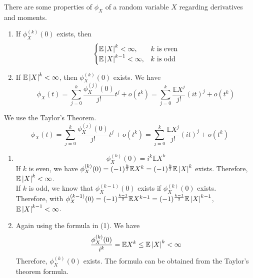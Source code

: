 \documentclass{huhtakm-template-book}
\newcommand{\expect}{\mathbb{E}}
\begin{document}
\begin{thm}
	There are some properties of $\phi_{X}$ of a random variable $X$ regarding derivatives and moments.
	\begin{enumerate}
		\item If $\phi_{X}^{(k)}(0)$ exists, then
		\begin{equation*}
			\begin{cases}
				\expect\abs{X}^{k}<\infty, &k\text{ is even}\\
				\expect\abs{X}^{k-1}<\infty, &k\text{ is odd}
			\end{cases}
		\end{equation*}
		\item If $\expect\abs{X}^{k}<\infty$, then $\phi_{X}^{(k)}(0)$ exists. We have
		\begin{equation*}
			\phi_{X}(t)=\sum_{j=0}^{k}\frac{\phi_{X}^{(j)}(0)}{j!}t^{j}+o(t^{k})=\sum_{j=0}^{k}\frac{\expect X^{j}}{j!}(it)^{j}+o(t^{k})
		\end{equation*}
	\end{enumerate}
\end{thm}
\begin{proofing}
	We use the Taylor's Theorem.
	\begin{equation*}
		\phi_{X}(t)=\sum_{j=0}^{k}\frac{\phi_{X}^{(j)}(0)}{j!}t^{j}+o(t^{k})=\sum_{j=0}^{k}\frac{\expect X^{j}}{j!}(it)^{j}+o(t^{k})
	\end{equation*}
	\begin{enumerate}
		\item 
		\begin{equation*}
			\phi_{X}^{(k)}(0)=i^{k}\expect X^{k}
		\end{equation*}
		If $k$ is even, we have $\phi_{X}^{(k)}(0)=(-1)^{\frac{k}{2}}\expect X^{k}=(-1)^{\frac{k}{2}}\expect\abs{X}^{k}$ exists. Therefore, $\expect\abs{X}^{k}<\infty$.\\
		If $k$ is odd, we know that $\phi_{X}^{(k-1)}(0)$ exists if $\phi_{X}^{(k)}(0)$ exists.\\
		Therefore, with $\phi_{X}^{(k-1)}(0)=(-1)^{\frac{k-1}{2}}\expect X^{k-1}=(-1)^{\frac{k-1}{2}}\expect\abs{X}^{k-1}$, $\expect\abs{X}^{k-1}<\infty$.
		\item Again using the formula in (1). We have
		\begin{equation*}
			\frac{\phi_{X}^{(k)}(0)}{i^{k}}=\expect X^{k}\leq\expect\abs{X}^{k}<\infty
		\end{equation*}
		Therefore, $\phi_{X}^{(k)}(0)$ exists. The formula can be obtained from the Taylor's theorem formula.
	\end{enumerate}
\end{proofing}
\end{document}
